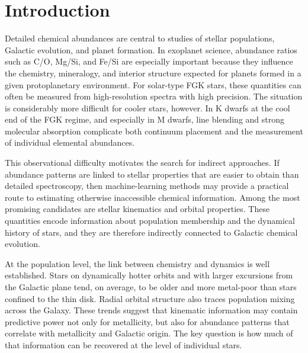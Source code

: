 \documentclass{aa}
\begin{document}

\maketitle



\section{Introduction}

Detailed chemical abundances are central to studies of stellar populations, Galactic evolution, and planet formation. In exoplanet science, abundance ratios such as C/O, Mg/Si, and Fe/Si are especially important because they influence the chemistry, mineralogy, and interior structure expected for planets formed in a given protoplanetary environment. For solar-type FGK stars, these quantities can often be measured from high-resolution spectra with high precision. The situation is considerably more difficult for cooler stars, however. In K dwarfs at the cool end of the FGK regime, and especially in M dwarfs, line blending and strong molecular absorption complicate both continuum placement and the measurement of individual elemental abundances.

This observational difficulty motivates the search for indirect approaches. If abundance patterns are linked to stellar properties that are easier to obtain than detailed spectroscopy, then machine-learning methods may provide a practical route to estimating otherwise inaccessible chemical information. Among the most promising candidates are stellar kinematics and orbital properties. These quantities encode information about population membership and the dynamical history of stars, and they are therefore indirectly connected to Galactic chemical evolution.

At the population level, the link between chemistry and dynamics is well established. Stars on dynamically hotter orbits and with larger excursions from the Galactic plane tend, on average, to be older and more metal-poor than stars confined to the thin disk. Radial orbital structure also traces population mixing across the Galaxy. These trends suggest that kinematic information may contain predictive power not only for metallicity, but also for abundance patterns that correlate with metallicity and Galactic origin. The key question is how much of that information can be recovered at the level of individual stars.
\end{document}
